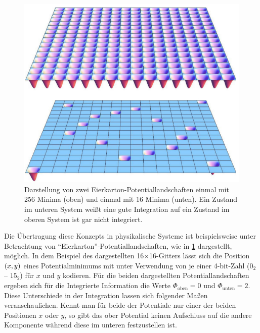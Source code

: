 \FloatBarrier
\begin{figure}
	\centering
	\includegraphics[scale=0.23]{graphics/egg_crate_potentials.jpg}
	\caption{Darstellung von zwei Eierkarton-Potentiallandschaften einmal mit 256 Minima (oben) und einmal 
		mit 16 Minima (unten). Ein Zustand im unteren System weißt eine gute Integration auf ein Zustand im oberen System ist gar nicht integriert.\label{fig:eggcrate_potential}}
\end{figure}  


Die Übertragung diese Konzepts in physikalische Systeme ist beispielsweise unter Betrachtung von 
\enquote{Eierkarton}-Potentiallandschaften, wie in \cref{fig:eggcrate_potential} dargestellt, möglich.
In dem Beispiel des dargestellten 16$\times$16-Gitters lässt sich die Position $\del{x,y}$ eines Potentialminimums
mit unter Verwendung von je einer 4-bit-Zahl ($0_2$ -- $15_2$) für $x$ und $y$ kodieren. Für die beiden dargestellten 
Potentiallandschaften ergeben sich für die Integrierte Information die Werte $\Phi_{\mathrm{oben}} = 0$  und 
$\Phi_{\mathrm{unten}} = 2$. Diese Unterschiede in der Integration lassen sich folgender Maßen veranschaulichen.
Kennt man für beide der Potentiale nur einer der beiden Positionen $x$ oder $y$, so gibt das ober Potential keinen
Aufschluss auf die andere Komponente während diese im unteren festzustellen ist.

